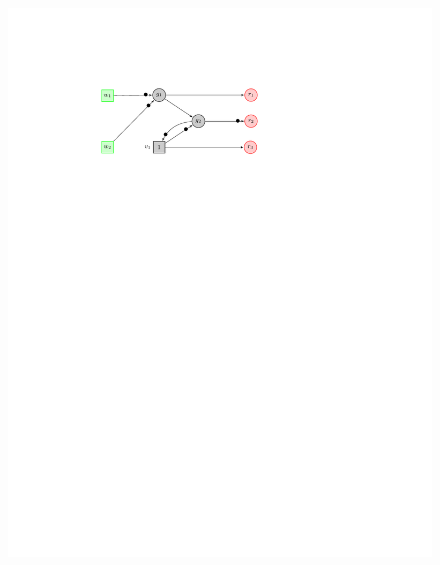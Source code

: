 {\begin{quote}
\begin{example}
\end{example}
\end{quote}
\begin{figure}[!t]
\begin{minipage}{0.6\textwidth}
\begin{framed}
\includegraphics[width=\textwidth]{Example.pdf}
\end{framed}
\end{minipage}
\begin{minipage}{0.35\textwidth}
\centering
\begin{framed}

\end{framed}
\end{minipage}
\end{figure}}
